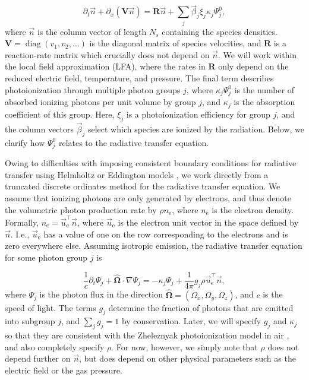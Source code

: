 \documentclass{iopjournal}
\newcommand{\e}{\ensuremath{\text{e}}}
\DeclareMathOperator\diag{diag}
\begin{document}
\begin{equation}
  \label{eq:drift_reaction}
  \partial_t\vec{n} + \partial_x\left(\bm{V}\vec{n}\right) = \bm{R}\vec{n} + \sum_j\vec{\beta}_j\xi_j\kappa_j\Psi_j^0,
\end{equation}
where $\vec{n}$ is the column vector of length $N_s$ containing the species densities.
$\bm{V}=\diag\left(v_1,v_2,\ldots\right)$ is the diagonal matrix of species velocities, and $\bm{R}$ is a reaction-rate matrix which crucially does not depend on $\vec{n}$.
We will work within the local field approximation (LFA), where the rates in $\bm{R}$ only depend on the reduced electric field, temperature, and pressure.
The final term describes photoionization through multiple photon groups $j$, where $\kappa_j\Psi_j^0$ is the number of absorbed ionizing photons per unit volume by group $j$, and $\kappa_j$ is the absorption coefficient of this group.
Here, $\xi_j$ is a photoionization efficiency for group $j$, and the column vectors $\vec{\beta}_j$ select which species are ionized by the radiation.
Below, we clarify how $\Psi_j^0$ relates to the radiative transfer equation.

Owing to difficulties with imposing consistent boundary conditions for radiative transfer using Helmholtz or Eddington models \cite{Bourdon2007, Marskar2019a}, we work directly from a truncated discrete ordinates method for the radiative transfer equation.
We assume that ionizing photons are only generated by electrons, and thus denote the volumetric photon production rate by $\rho n_\e$, where $n_\e$ is the electron density.
Formally, $n_\e = \vec{u}_\e^\intercal \vec{n}$, where $\vec{u}_\e$ is the electron unit vector in the space defined by $\vec{n}$.
I.e., $\vec{u}_\e$ has a value of one on the row corresponding to the electrons and is zero everywhere else.
Assuming isotropic emission, the radiative transfer equation for some photon group $j$ is

\begin{equation}
  \frac{1}{c}\partial_t \Psi_j + \hat{\bm{\Omega}}\cdot\nabla \Psi_j = -\kappa_j\Psi_j + \frac{1}{4\pi}g_j\rho\vec{u}_\e^\intercal \vec{n},
\end{equation}
where $\Psi_j$ is the photon flux in the direction $\hat{\bm{\Omega}} = (\Omega_x, \Omega_y, \Omega_z)$, and $c$ is the speed of light.
The terms $g_j$ determine the fraction of photons that are emitted into subgroup $j$, and $\sum_j g_j = 1$ by conservation.
Later, we will specify $g_j$ and $\kappa_j$ so that they are consistent with the Zheleznyak photoionization model in air \cite{1982TepVT..20..423Z}, and also completely specify $\rho$.
For now, however, we simply note that $\rho$ does not depend further on $\vec{n}$, but does depend on other physical parameters such as the electric field or the gas pressure.
\end{document}
